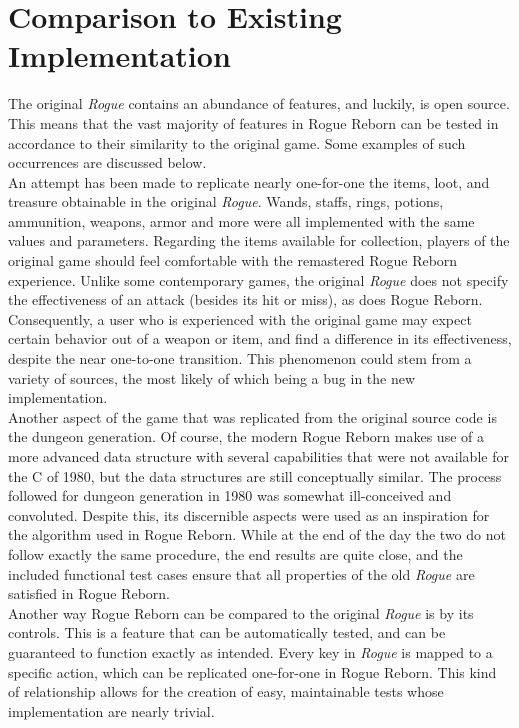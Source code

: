 \documentclass[12pt, titlepage]{article}
\begin{document}
\newpage
\section{Comparison to Existing Implementation}	
\label{section5}
	The original \textit{Rogue} contains an abundance of features, and luckily, is open source.  This means that the vast majority of features in Rogue Reborn can be tested in accordance to their similarity to the original game. Some examples of such occurrences are discussed below.\\

	An attempt has been made to replicate nearly one-for-one the items, loot, and treasure obtainable in the original \textit{Rogue}.  Wands, staffs, rings, potions, ammunition, weapons, armor and more were all implemented with the same values and parameters.  Regarding the items available for collection, players of the original game should feel comfortable with the remastered Rogue Reborn experience.  Unlike some contemporary games, the original \textit{Rogue} does not specify the effectiveness of an attack (besides its hit or miss), as does Rogue Reborn.  Consequently, a user who is experienced with the original game may expect certain behavior out of a weapon or item, and find a difference in its effectiveness, despite the near one-to-one transition.  This phenomenon could stem from a variety of sources, the most likely of which being a bug in the new implementation.\\

	Another aspect of the game that was replicated from the original source code is the dungeon generation.  Of course, the modern Rogue Reborn makes use of a more advanced data structure with several capabilities that were not available for the C of 1980, but the data structures are still conceptually similar.  The process followed for dungeon generation in 1980 was somewhat ill-conceived and convoluted.  Despite this, its discernible aspects were used as an inspiration for the algorithm used in Rogue Reborn.  While at the end of the day the two do not follow exactly the same procedure, the end results are quite close, and the included functional test cases ensure that all properties of the old \textit{Rogue} are satisfied in Rogue Reborn.\\

	Another way Rogue Reborn can be compared to the original \textit{Rogue} is by its controls.  This is a feature that can be automatically tested, and can be guaranteed to function exactly as intended.  Every key in \textit{Rogue} is mapped to a specific action, which can be replicated one-for-one in Rogue Reborn.  This kind of relationship allows for the creation of easy, maintainable tests whose implementation are nearly trivial.\\
\end{document}
